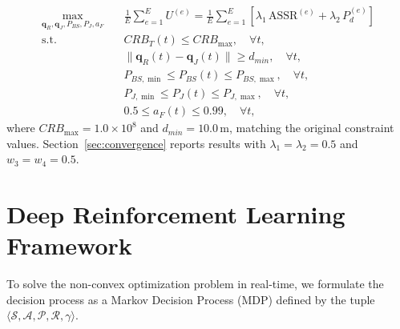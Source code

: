 \documentclass[journal,onecolumn]{IEEEtran}
\begin{document}
\begin{subequations}
\begin{align}
    \max_{\mathbf{q}_R, \mathbf{q}_J, P_{BS}, P_J, a_F} \quad & \frac{1}{E} \sum_{e=1}^{E} U^{(e)} = \frac{1}{E} \sum_{e=1}^{E} \left[ \lambda_1 \,\text{ASSR}^{(e)} + \lambda_2 \,P_d^{(e)} \right] \\
    \text{s.t.} \quad & CRB_T(t) \le CRB_{\max}, \quad \forall t, \\
    & \|\mathbf{q}_R(t) - \mathbf{q}_J(t)\| \ge d_{min}, \quad \forall t, \\
    & P_{BS,\min} \le P_{BS}(t) \le P_{BS,\max}, \quad \forall t, \\
    & P_{J,\min} \le P_J(t) \le P_{J,\max}, \quad \forall t, \\
    & 0.5 \le a_F(t) \le 0.99, \quad \forall t,
\end{align}
\end{subequations}
where $CRB_{\max} = 1.0 \times 10^8$ and $d_{min} = 10.0$\,m, matching the original constraint values. Section~\ref{sec:convergence} reports results with $\lambda_1 = \lambda_2 = 0.5$ and $w_3 = w_4 = 0.5$.

\section{Deep Reinforcement Learning Framework}
To solve the non-convex optimization problem in real-time, we formulate the decision process as a Markov Decision Process (MDP) defined by the tuple $\langle \mathcal{S}, \mathcal{A}, \mathcal{P}, \mathcal{R}, \gamma \rangle$.
\end{document}
